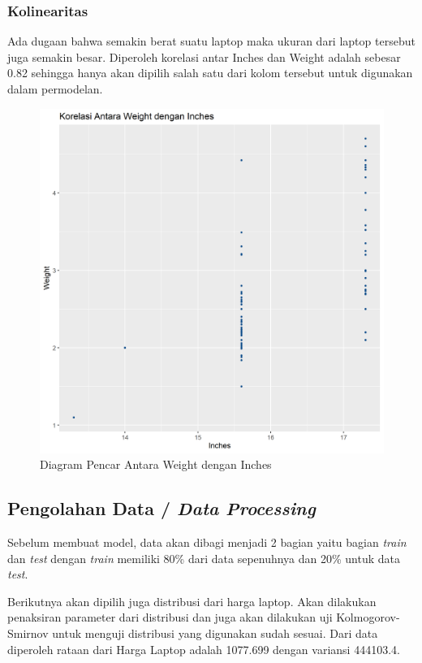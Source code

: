 \documentclass[12pt]{article}
\begin{document}
\subsubsection{Kolinearitas}  
Ada dugaan bahwa semakin berat suatu laptop maka ukuran dari laptop tersebut juga semakin besar. Diperoleh korelasi antar Inches dan Weight adalah sebesar 0.82 sehingga hanya akan dipilih salah satu dari kolom tersebut untuk digunakan dalam permodelan.  

\begin{figure}[h!]
    \centering
    \includegraphics[scale = 0.4]{inchesweight.png}
    \caption{Diagram Pencar Antara Weight dengan Inches}
    \label{inches}
\end{figure}    

\subsection{Pengolahan Data / \textit{Data Processing}}
Sebelum membuat model, data akan dibagi menjadi 2 bagian yaitu bagian \textit{train} dan \textit{test} dengan \textit{train} memiliki 80\% dari data sepenuhnya dan 20\% untuk data \textit{test}.  
\par 
Berikutnya akan dipilih juga distribusi dari harga laptop. Akan dilakukan penaksiran parameter dari distribusi dan juga akan dilakukan uji Kolmogorov-Smirnov untuk menguji distribusi yang digunakan sudah sesuai. Dari data diperoleh rataan dari Harga Laptop adalah 1077.699 dengan variansi 444103.4.
\end{document}
